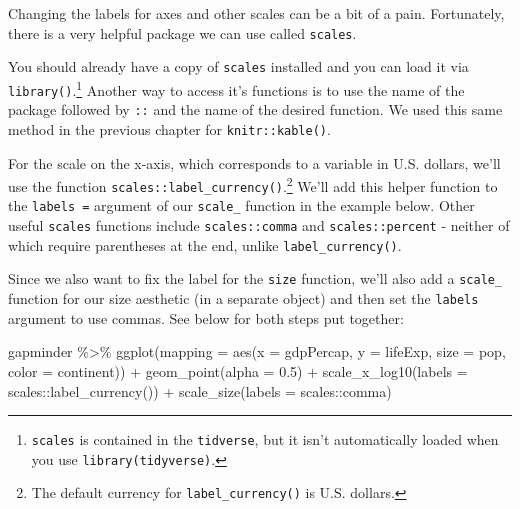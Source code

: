 \documentclass[
  letterpaper,
]{book}
\newenvironment{Shaded}{\begin{snugshade}}{\end{snugshade}}
\newcommand{\AttributeTok}[1]{\textcolor[rgb]{0.40,0.45,0.13}{#1}}
\newcommand{\FloatTok}[1]{\textcolor[rgb]{0.68,0.00,0.00}{#1}}
\newcommand{\FunctionTok}[1]{\textcolor[rgb]{0.28,0.35,0.67}{#1}}
\newcommand{\NormalTok}[1]{\textcolor[rgb]{0.00,0.23,0.31}{#1}}
\newcommand{\SpecialCharTok}[1]{\textcolor[rgb]{0.37,0.37,0.37}{#1}}
\begin{document}
Changing the labels for axes and other scales can be a bit of a pain.
Fortunately, there is a very helpful package we can use called
\texttt{scales}.

You should already have a copy of \texttt{scales} installed and you can
load it via \texttt{library()}.\footnote{\texttt{scales} is contained in
  the \texttt{tidverse}, but it isn't automatically loaded when you use
  \texttt{library(tidyverse)}.} Another way to access it's functions is
to use the name of the package followed by \texttt{::} and the name of
the desired function. We used this same method in the previous chapter
for \texttt{knitr::kable()}.

For the scale on the x-axis, which corresponds to a variable in U.S.
dollars, we'll use the function
\texttt{scales::label\_currency()}.\footnote{The default currency for
  \texttt{label\_currency()} is U.S. dollars.} We'll add this helper
function to the \texttt{labels\ =} argument of our \texttt{scale\_}
function in the example below. Other useful \texttt{scales} functions
include \texttt{scales::comma} and \texttt{scales::percent} - neither of
which require parentheses at the end, unlike \texttt{label\_currency()}.

Since we also want to fix the label for the \texttt{size} function,
we'll also add a \texttt{scale\_} function for our size aesthetic (in a
separate object) and then set the \texttt{labels} argument to use
commas. See below for both steps put together:

\begin{Shaded}
\begin{Highlighting}[]
\NormalTok{gapminder }\SpecialCharTok{\%\textgreater{}\%}
  \FunctionTok{ggplot}\NormalTok{(}\AttributeTok{mapping =} \FunctionTok{aes}\NormalTok{(}\AttributeTok{x =}\NormalTok{ gdpPercap, }
                       \AttributeTok{y =}\NormalTok{ lifeExp,}
                       \AttributeTok{size =}\NormalTok{ pop,}
                       \AttributeTok{color =}\NormalTok{ continent)) }\SpecialCharTok{+}
  \FunctionTok{geom\_point}\NormalTok{(}\AttributeTok{alpha =} \FloatTok{0.5}\NormalTok{) }\SpecialCharTok{+} 
  \FunctionTok{scale\_x\_log10}\NormalTok{(}\AttributeTok{labels =}\NormalTok{ scales}\SpecialCharTok{::}\FunctionTok{label\_currency}\NormalTok{()) }\SpecialCharTok{+}
  \FunctionTok{scale\_size}\NormalTok{(}\AttributeTok{labels =}\NormalTok{ scales}\SpecialCharTok{::}\NormalTok{comma)}
\end{Highlighting}
\end{Shaded}
\end{document}
